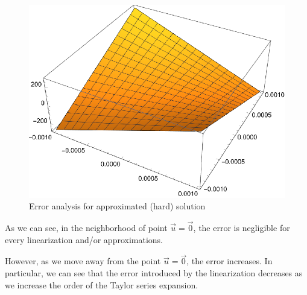 \begin{figure}[H]
    \centering
    \includegraphics[width=.5\textwidth]{./pdf/error_approximated_hard}
    \caption{Error analysis for approximated (hard) solution}
    \label{fig:error_approximated_hard}
\end{figure}

As we can see, in the neighborhood of point $\vec{u} = \vec{0}$, the error is negligible for every linearization and/or approximations.

However, as we move away from the point $\vec{u} = \vec{0}$, the error increases.
In particular, we can see that the error introduced by the linearization decreases as we increase the order of the Taylor series expansion.